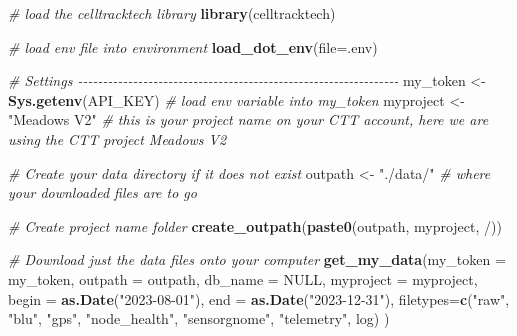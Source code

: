 \documentclass[
]{book}
\newenvironment{Shaded}{\begin{snugshade}}{\end{snugshade}}
\newcommand{\AttributeTok}[1]{\textcolor[rgb]{0.13,0.29,0.53}{#1}}
\newcommand{\CommentTok}[1]{\textcolor[rgb]{0.56,0.35,0.01}{\textit{#1}}}
\newcommand{\ConstantTok}[1]{\textcolor[rgb]{0.56,0.35,0.01}{#1}}
\newcommand{\FunctionTok}[1]{\textcolor[rgb]{0.13,0.29,0.53}{\textbf{#1}}}
\newcommand{\NormalTok}[1]{#1}
\newcommand{\OtherTok}[1]{\textcolor[rgb]{0.56,0.35,0.01}{#1}}
\newcommand{\StringTok}[1]{\textcolor[rgb]{0.31,0.60,0.02}{#1}}
\begin{document}
\begin{Shaded}
\begin{Highlighting}[]
\CommentTok{\# load the celltracktech library}
\FunctionTok{library}\NormalTok{(celltracktech)}

\CommentTok{\# load env file into environment}
\FunctionTok{load\_dot\_env}\NormalTok{(}\AttributeTok{file=}\StringTok{\textquotesingle{}.env\textquotesingle{}}\NormalTok{)}

\CommentTok{\# Settings {-}{-}{-}{-}{-}{-}{-}{-}{-}{-}{-}{-}{-}{-}{-}{-}{-}{-}{-}{-}{-}{-}{-}{-}{-}{-}{-}{-}{-}{-}{-}{-}{-}{-}{-}{-}{-}{-}{-}{-}{-}{-}{-}{-}{-}{-}{-}{-}{-}{-}{-}{-}{-}{-}{-}{-}{-}{-}{-}{-}{-}{-}{-}{-}}
\NormalTok{my\_token }\OtherTok{\textless{}{-}} \FunctionTok{Sys.getenv}\NormalTok{(}\StringTok{\textquotesingle{}API\_KEY\textquotesingle{}}\NormalTok{) }\CommentTok{\# load env variable into my\_token}
\NormalTok{myproject }\OtherTok{\textless{}{-}} \StringTok{"Meadows V2"} \CommentTok{\# this is your project name on your CTT account, here we are using the CTT project \textquotesingle{}Meadows V2\textquotesingle{}}

\CommentTok{\# Create your data directory if it does not exist}
\NormalTok{outpath }\OtherTok{\textless{}{-}} \StringTok{"./data/"} \CommentTok{\# where your downloaded files are to go}

\CommentTok{\# Create project name folder}
\FunctionTok{create\_outpath}\NormalTok{(}\FunctionTok{paste0}\NormalTok{(outpath, myproject, }\StringTok{\textquotesingle{}/\textquotesingle{}}\NormalTok{))}

\CommentTok{\# Download just the data files onto your computer}
\FunctionTok{get\_my\_data}\NormalTok{(}\AttributeTok{my\_token =}\NormalTok{ my\_token,}
            \AttributeTok{outpath =}\NormalTok{ outpath, }
            \AttributeTok{db\_name =} \ConstantTok{NULL}\NormalTok{,}
            \AttributeTok{myproject =}\NormalTok{ myproject,}
            \AttributeTok{begin =} \FunctionTok{as.Date}\NormalTok{(}\StringTok{"2023{-}08{-}01"}\NormalTok{),}
            \AttributeTok{end =} \FunctionTok{as.Date}\NormalTok{(}\StringTok{"2023{-}12{-}31"}\NormalTok{),}
            \AttributeTok{filetypes=}\FunctionTok{c}\NormalTok{(}\StringTok{"raw"}\NormalTok{, }\StringTok{"blu"}\NormalTok{, }\StringTok{"gps"}\NormalTok{, }\StringTok{"node\_health"}\NormalTok{, }\StringTok{"sensorgnome"}\NormalTok{, }\StringTok{"telemetry"}\NormalTok{, }\StringTok{\textquotesingle{}log\textquotesingle{}}\NormalTok{)}
\NormalTok{)}
\end{Highlighting}
\end{Shaded}
\end{document}
